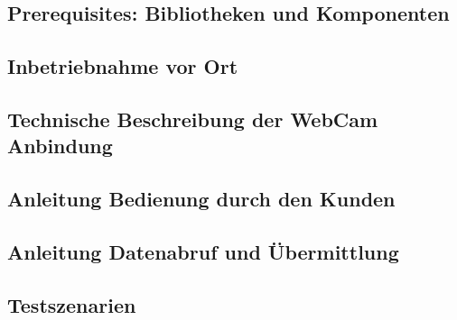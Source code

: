 \subsection{Prerequisites: Bibliotheken und Komponenten}
\subsection{Inbetriebnahme vor Ort}
\subsection{Technische Beschreibung der WebCam Anbindung}
\subsection{Anleitung Bedienung durch den Kunden}
\subsection{Anleitung Datenabruf und Übermittlung}
\subsection{Testszenarien}

